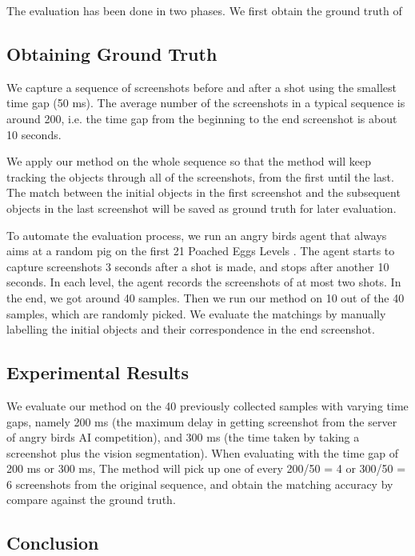 \documentclass[letterpaper]{article}
\begin{document}
The evaluation has been done in two phases. We first obtain the ground truth of 

\subsection{Obtaining Ground Truth}
 
 We capture a sequence of screenshots before and after a shot using the smallest time gap (50 ms). The average number of the screenshots in a typical sequence is around 200, i.e. the time gap from the beginning to the end screenshot is about 10 seconds. 

 We apply our method on the whole sequence so that the method will keep tracking the objects through all of the screenshots, from the first until the last. The match between the initial objects in the first screenshot and the subsequent objects in the last screenshot will be saved as ground truth for later evaluation.

To automate the evaluation process, we run an angry birds agent that always aims at a random pig on the first 21 Poached Eggs Levels \cite{}. The agent starts to capture screenshots 3 seconds after a shot is made, and stops after another 10 seconds. In each level, the agent records the screenshots of at most two shots. In the end, we got around 40 samples. Then we run our method on 10 out of the 40 samples, which are randomly picked. We evaluate the matchings by manually labelling the initial objects and their correspondence in the end screenshot.  



\subsection{Experimental Results}

We evaluate our method on the 40 previously collected samples with varying time gaps, namely 200 ms (the maximum delay in getting screenshot from the server of angry birds AI competition), and 300 ms (the time taken by taking a screenshot plus the vision segmentation). When evaluating with the time gap of 200 ms or 300 ms, The method will pick up one of every 200/50 = 4 or 300/50 = 6 screenshots from the original sequence, and obtain the matching accuracy by compare against the ground truth.  





\subsection{Conclusion}
\end{document}
